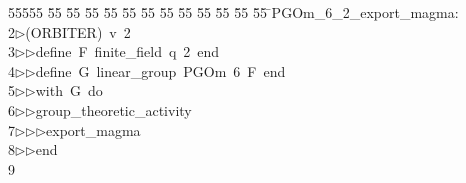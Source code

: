 %
%
\begin{tabbing}
55555 \= 55 \= 55 \= 55 \= 55 \= 55 \= 55 \= 55 \= 55 \= 55 \= 55 \= 55 \= 55 \= \>PGOm\_6\_2\_export\_magma:\\[0pt]
2\>$\triangleright$\>(ORBITER)\ v\ 2\ \\[0pt]
3\>$\triangleright$\>$\triangleright$\>define\ F\ finite\_field\ q\ 2\ end\ \\[0pt]
4\>$\triangleright$\>$\triangleright$\>define\ G\ linear\_group\ PGOm\ 6\ F\ end\ \\[0pt]
5\>$\triangleright$\>$\triangleright$\>with\ G\ do\ \\[0pt]
6\>$\triangleright$\>$\triangleright$\>group\_theoretic\_activity\ \\[0pt]
7\>$\triangleright$\>$\triangleright$\>$\triangleright$\>export\_magma\ \\[0pt]
8\>$\triangleright$\>$\triangleright$\>end\\[0pt]
9\>\end{tabbing}
